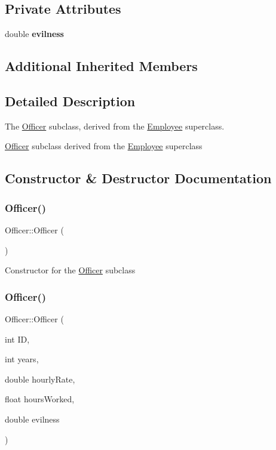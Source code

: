 \subsection*{Private Attributes}
\begin{DoxyCompactItemize}
\item 
\mbox{\label{classOfficer_a63465c5f16e8148e5bc0a3bb4ecd1781}} 
double {\bfseries evilness}
\end{DoxyCompactItemize}
\subsection*{Additional Inherited Members}


\subsection{Detailed Description}
The \hyperlink{classOfficer}{Officer} subclass, derived from the \hyperlink{classEmployee}{Employee} superclass. 

\hyperlink{classOfficer}{Officer} subclass derived from the \hyperlink{classEmployee}{Employee} superclass 

\subsection{Constructor \& Destructor Documentation}
\mbox{\label{classOfficer_a80ac1e36a3f36c3a7e12b5dc9320ad89}} 
\subsubsection{\texorpdfstring{Officer()}{Officer()}\hspace{0.1cm}{\footnotesize\ttfamily [1/2]}}
{\footnotesize\ttfamily Officer\+::\+Officer (\begin{DoxyParamCaption}{ }\end{DoxyParamCaption})}

Constructor for the \hyperlink{classOfficer}{Officer} subclass \mbox{\label{classOfficer_ac75c45d6e8628606278cb4ce6596f67f}} 
\subsubsection{\texorpdfstring{Officer()}{Officer()}\hspace{0.1cm}{\footnotesize\ttfamily [2/2]}}
{\footnotesize\ttfamily Officer\+::\+Officer (\begin{DoxyParamCaption}\item[{int}]{ID,  }\item[{int}]{years,  }\item[{double}]{hourly\+Rate,  }\item[{float}]{hours\+Worked,  }\item[{double}]{evilness }\end{DoxyParamCaption})}

